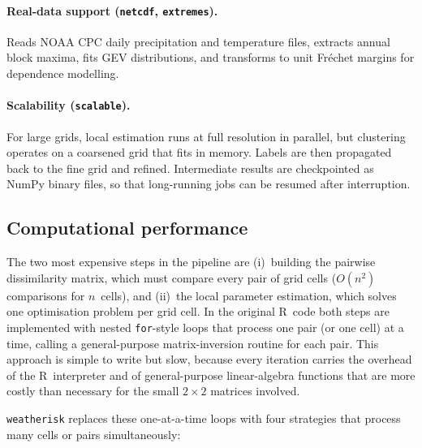 \documentclass[preprint,12pt,a4paper]{elsarticle}
\begin{document}
\paragraph{Real-data support (\texttt{netcdf}, \texttt{extremes}).}
Reads NOAA CPC daily precipitation and temperature files,
extracts annual block maxima, fits GEV distributions, and
transforms to unit Fr\'{e}chet margins for dependence modelling.

\paragraph{Scalability (\texttt{scalable}).}
For large grids, local estimation runs at full resolution in
parallel, but clustering operates on a coarsened grid that fits
in memory.  Labels are then propagated back to the fine grid
and refined.  Intermediate results are checkpointed as NumPy
binary files, so that long-running jobs can be resumed after
interruption.

\subsection{Computational performance}
\label{sec:performance}

The two most expensive steps in the pipeline are (i)~building the
pairwise dissimilarity matrix, which must compare every pair of
grid cells ($O(n^2)$ comparisons for $n$~cells), and (ii)~the
local parameter estimation, which solves one optimisation problem
per grid cell.  In the original R~code both steps are implemented
with nested \texttt{for}-style loops that process one pair (or one
cell) at a time, calling a general-purpose matrix-inversion routine
for each pair.  This approach is simple to write but slow, because
every iteration carries the overhead of the R~interpreter and of
general-purpose linear-algebra functions that are more costly than
necessary for the small $2\times 2$ matrices involved.

\texttt{weatherisk} replaces these one-at-a-time loops with four
strategies that process many cells or pairs simultaneously:
\end{document}
